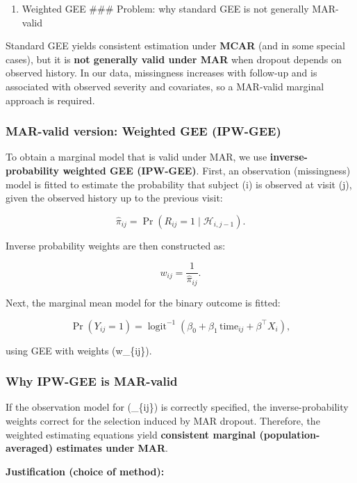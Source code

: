 \documentclass[
  11pt,
  letterpaper,
  DIV=11,
  numbers=noendperiod]{scrartcl}
\providecommand{\tightlist}{%
  \setlength{\itemsep}{0pt}\setlength{\parskip}{0pt}}\usepackage{longtable,booktabs,array}
\begin{document}
\begin{enumerate}
\def\labelenumi{\arabic{enumi}.}
\setcounter{enumi}{2}
\tightlist
\item
  Weighted GEE \#\#\# Problem: why standard GEE is not generally
  MAR-valid
\end{enumerate}

Standard GEE yields consistent estimation under \textbf{MCAR} (and in
some special cases), but it is \textbf{not generally valid under MAR}
when dropout depends on observed history. In our data, missingness
increases with follow-up and is associated with observed severity and
covariates, so a MAR-valid marginal approach is required.

\subsubsection{MAR-valid version: Weighted GEE
(IPW-GEE)}\label{mar-valid-version-weighted-gee-ipw-gee}

To obtain a marginal model that is valid under MAR, we use
\textbf{inverse-probability weighted GEE (IPW-GEE)}. First, an
observation (missingness) model is fitted to estimate the probability
that subject (i) is observed at visit (j), given the observed history up
to the previous visit:

\[
\widehat{\pi}_{ij} = \Pr\!\left(R_{ij}=1 \mid \mathcal{H}_{i,j-1}\right).
\]

Inverse probability weights are then constructed as:

\[
w_{ij}=\frac{1}{\widehat{\pi}_{ij}}.
\]

Next, the marginal mean model for the binary outcome is fitted:

\[
\Pr(Y_{ij}=1)
= \operatorname{logit}^{-1}\!\left(\beta_0+\beta_1\,\text{time}_{ij}+\beta^\top X_i\right),
\]

using GEE with weights (w\_\{ij\}).

\subsubsection{Why IPW-GEE is MAR-valid}\label{why-ipw-gee-is-mar-valid}

If the observation model for (\pi\_\{ij\}) is correctly specified, the
inverse-probability weights correct for the selection induced by MAR
dropout. Therefore, the weighted estimating equations yield
\textbf{consistent marginal (population-averaged) estimates under MAR}.

\textbf{Justification (choice of method):}
\end{document}
